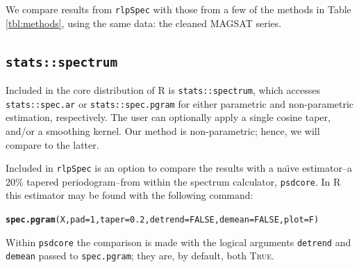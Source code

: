 \documentclass{article}\usepackage{graphicx, color}
\makeatletter
\newcommand{\hlfunctioncall}[1]{\textcolor[rgb]{0.501960784313725,0,0.329411764705882}{\textbf{#1}}}%
\newenvironment{kframe}{%
 \def\at@end@of@kframe{}%
 \ifinner\ifhmode%
  \def\at@end@of@kframe{\end{minipage}}%
  \begin{minipage}{\columnwidth}%
 \fi\fi%
 \def\FrameCommand##1{\hskip\@totalleftmargin \hskip-\fboxsep
 \colorbox{shadecolor}{##1}\hskip-\fboxsep
     \hskip-\linewidth \hskip-\@totalleftmargin \hskip\columnwidth}%
 \MakeFramed {\advance\hsize-\width
   \@totalleftmargin\z@ \linewidth\hsize
   \@setminipage}}%
 {\par\unskip\endMakeFramed%
 \at@end@of@kframe}
\newenvironment{knitrout}{}{} %
\newcommand{\SC}[1]{\textsc{#1}}
\newcommand{\Rcmd}[1]{\texttt{#1}}
\newcommand{\rlp}[0]{\Rcmd{rlpSpec}}
\newcommand{\naive}[0]{na\"{\i}ve}
\makeatother
\begin{document}


We compare results from
\rlp{} with those from a few of the methods in Table \ref{tbl:methods},
using the same data: the cleaned MAGSAT series.

\subsection{\Rcmd{stats::spectrum}}

Included in the core distribution of R is \Rcmd{stats::spectrum}, which
accesses \Rcmd{stats::spec.ar} or \Rcmd{stats::spec.pgram} for either
parametric and non-parametric estimation, respectively.  
The user can optionally apply a single cosine taper, and/or a smoothing kernel.
Our method is non-parametric; hence, we will compare to the latter.

Included in \rlp{} is an option to compare the 
results with a \naive{} estimator--a 20\% tapered periodogram--from within the
spectrum calculator, \Rcmd{psdcore}.
In R this estimator may be found with the following command:
\begin{knitrout}
\color{fgcolor}\begin{kframe}
\begin{alltt}
\hlfunctioncall{spec.pgram}(X, pad = 1, taper = 0.2, detrend = FALSE, demean = FALSE, plot = F)
\end{alltt}
\end{kframe}
\end{knitrout}

Within \Rcmd{psdcore} the comparison is
made with
the logical arguments \Rcmd{detrend} and \Rcmd{demean} 
passed to \Rcmd{spec.pgram}; they are,
by default, both \SC{True}.
\end{document}
